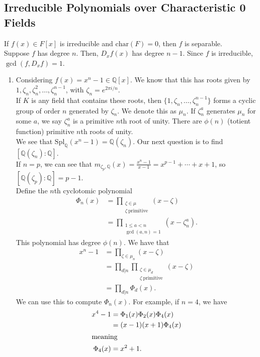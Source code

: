 \documentclass[10pt]{extarticle}
\newcommand{\Q}{\mathbb{Q}}
\begin{document}
  \subsection{Irreducible Polynomials over Characteristic 0 Fields}%
  If $f(x)\in F[x]$ is irreducible and $\text{char}(F) = 0$, then $f$ is separable.\\

  Suppose $f$ has degree $n$. Then, $D_xf(x)$ has degree $n-1$. Since $f$ is irreducible, $\gcd(f,D_xf) = 1$.
  \begin{enumerate}[(1)]
    \item Considering $f(x) = x^n - 1\in \Q[x]$. We know that this has roots given by $1,\zeta_n,\zeta_n^2,\dots,\zeta_n^{n-1}$, with $\zeta_n = e^{2\pi i/n}$.\\

      If $K$ is any field that contains these roots, then $\{1,\zeta_n,\dots,\zeta_{n}^{n-1}\}$ forms a cyclic group of order $n$ generated by $\zeta_n$. We denote this as $\mathbb{\mu}_n$. If $\zeta_n^{a}$ generates $\mathbb{\mu}_n$ for some $a$, we say $\zeta_n^{a}$ is a primitive $n$th root of unity. There are $\phi(n)$ (totient function) primitive $n$th roots of unity.\\

      We see that $\text{Spl}_{\Q}(x^n - 1) = \Q(\zeta_n)$. Our next question is to find $[\Q(\zeta_n):\Q]$.\\

      If $n = p$, we can see that $m_{\zeta_p,\Q}(x) = \frac{x^n-1}{x-1} = x^{p-1} + \cdots + x + 1$, so $[\Q(\zeta_p):\Q] = p-1$.\\

      Define the $n$th cyclotomic polynomial
      \begin{align*}
        \Phi_n(x) &= \prod_{\substack{\zeta\in \mathbb{\mu}\\ \zeta~\text{primitive}}} (x-\zeta)\\
                  &= \prod_{\substack{1\leq a < n\\\gcd(a,n)=1}}(x-\zeta_{n}^{a}).
      \end{align*}
      This polynomial has degree $\phi(n)$. We have that
      \begin{align*}
        x^n-1 &= \prod_{\zeta\in \mathbb{\mu}_n}(x-\zeta)\\
              &= \prod_{d|n}\prod_{\substack{\zeta\in \mathbb{\mu}_d\\\zeta~\text{primitive}}}(x-\zeta)\\
              &= \prod_{d|n}\Phi_d(x).
      \end{align*}
      We can use this to compute $\Phi_n(x)$. For example, if $n=4$, we have
      \begin{align*}
        x^{4}-1 &= \Phi_1(x) \Phi_2(x)\Phi_4(x)\\
                &= (x-1)(x+1)\Phi_4(x)\\
                \intertext{meaning}
        \Phi_4(x) &= x^2 + 1.
      \end{align*}
  \end{enumerate}
\end{document}
